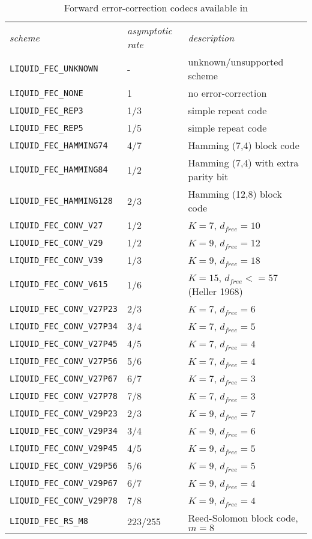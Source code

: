 \begin{table*}
\caption{Forward error-correction codecs available in \liquid}
\label{tab:fec:codecs}
\centering
{\small
\begin{tabular*}{0.95\textwidth}{l@{\extracolsep{\fill}}ll}
\toprule
{\it scheme} &
{\it asymptotic rate} &
{\it description}\\\otoprule
%
{\tt LIQUID\_FEC\_UNKNOWN}      & -         & unknown/unsupported scheme\\
{\tt LIQUID\_FEC\_NONE}         & 1         & no error-correction\\
{\tt LIQUID\_FEC\_REP3}         & 1/3       & simple repeat code\\
{\tt LIQUID\_FEC\_REP5}         & 1/5       & simple repeat code\\
{\tt LIQUID\_FEC\_HAMMING74}    & 4/7       & Hamming (7,4) block code\\
{\tt LIQUID\_FEC\_HAMMING84}    & 1/2       & Hamming (7,4) with extra parity bit\\
{\tt LIQUID\_FEC\_HAMMING128}   & 2/3       & Hamming (12,8) block code\\\midrule
%
{\tt LIQUID\_FEC\_CONV\_V27}    & 1/2       & $K=7$, $d_{free}=10$\\
{\tt LIQUID\_FEC\_CONV\_V29}    & 1/2       & $K=9$, $d_{free}=12$\\
{\tt LIQUID\_FEC\_CONV\_V39}    & 1/3       & $K=9$, $d_{free}=18$\\
{\tt LIQUID\_FEC\_CONV\_V615}   & 1/6       & $K=15$, $d_{free}<=57$ (Heller 1968)\\\midrule
%
{\tt LIQUID\_FEC\_CONV\_V27P23} & 2/3       & $K=7$, $d_{free}=6$\\
{\tt LIQUID\_FEC\_CONV\_V27P34} & 3/4       & $K=7$, $d_{free}=5$\\
{\tt LIQUID\_FEC\_CONV\_V27P45} & 4/5       & $K=7$, $d_{free}=4$\\
{\tt LIQUID\_FEC\_CONV\_V27P56} & 5/6       & $K=7$, $d_{free}=4$\\
{\tt LIQUID\_FEC\_CONV\_V27P67} & 6/7       & $K=7$, $d_{free}=3$\\
{\tt LIQUID\_FEC\_CONV\_V27P78} & 7/8       & $K=7$, $d_{free}=3$\\\midrule
%
{\tt LIQUID\_FEC\_CONV\_V29P23} & 2/3       & $K=9$, $d_{free}=7$\\
{\tt LIQUID\_FEC\_CONV\_V29P34} & 3/4       & $K=9$, $d_{free}=6$\\
{\tt LIQUID\_FEC\_CONV\_V29P45} & 4/5       & $K=9$, $d_{free}=5$\\
{\tt LIQUID\_FEC\_CONV\_V29P56} & 5/6       & $K=9$, $d_{free}=5$\\
{\tt LIQUID\_FEC\_CONV\_V29P67} & 6/7       & $K=9$, $d_{free}=4$\\
{\tt LIQUID\_FEC\_CONV\_V29P78} & 7/8       & $K=9$, $d_{free}=4$\\\midrule
% 
{\tt LIQUID\_FEC\_RS\_M8}       & 223/255   & Reed-Solomon block code, $m=8$\\\bottomrule



\end{tabular*}}
\end{table*}
